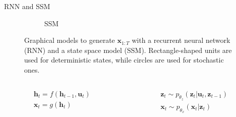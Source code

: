 \documentclass [aspectratio=169]{beamer}
\begin{document}
\begin{frame}{RNN and SSM}
\begin{figure}[H]
\begin{subfigure}{.48\textwidth}
%
          \caption{SSM}%
          \label{fig:ssm}%
        \end{subfigure}%
        \caption{Graphical models to generate $\mathbf{x}_{1:T}$ with a recurrent neural network (RNN) and a state space model (SSM).
        Rectangle-shaped units are used for deterministic states, while circles are used for stochastic ones.
        }%
        \label{fig:test}%
    \end{figure}%
    
    \begin{columns}
		\begin{column}{0.5\textwidth}
   		\begin{equation*}
   			\begin{array}{l}{\mathbf{h}_{t}=f\left(\mathbf{h}_{t-1}, \mathbf{u}_{t}\right)} \\ {\mathbf{x}_{t}=g\left(\mathbf{h}_{t}\right)}\end{array}
   		\end{equation*}
		\end{column}
		\begin{column}{0.5\textwidth}
			\begin{equation*}
				\begin{array}{l}{\mathbf{z}_{t} \sim p_{\theta_{z}}\left(\mathbf{z}_{t} | \mathbf{u}_{t}, \mathbf{z}_{t-1}\right)} \\ {\mathbf{x}_{t} \sim p_{\theta_{x}}\left(\mathbf{x}_{t} | \mathbf{z}_{t}\right)}\end{array}
			\end{equation*}
		\end{column}
\end{columns}

\end{frame}
\end{document}
